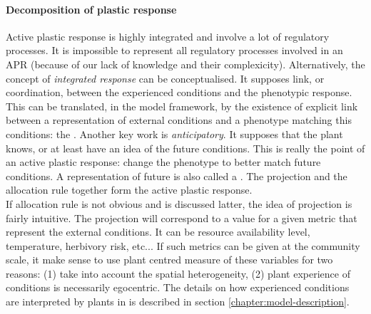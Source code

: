 \paragraph{Decomposition of plastic response}
Active plastic response is highly integrated and involve a lot of regulatory processes. It is impossible to represent all regulatory processes involved in an APR (because of our lack of knowledge and their complexicity). Alternatively, the concept of \textit{integrated response} can be conceptualised. It supposes link, or coordination, between the experienced conditions and the phenotypic response. This can be translated, in the model framework, by the existence of explicit link between a representation of external conditions and a phenotype matching this conditions: the . Another key work is \textit{anticipatory}. It supposes that the plant knows, or at least have an idea of the future conditions. This is really the point of an active plastic response: change the phenotype to better match future conditions. A representation of future is also called a . The projection and the allocation rule together form the active plastic response.\\
If allocation rule is not obvious and is discussed latter, the idea of projection is fairly intuitive. The projection will correspond to a value for a given metric that represent the external conditions. It can be resource availability level, temperature, herbivory risk, etc... If such metrics can be given at the community scale, it make sense to use plant centred measure of these variables for two reasons: (1) take into account the spatial heterogeneity, (2) plant experience of conditions is necessarily egocentric. The details on how experienced conditions are interpreted by plants in \model is described in section \ref{chapter:model-description}.

